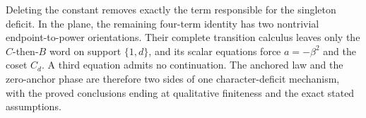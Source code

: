 \documentclass[11pt]{article}
\theoremstyle{definition}
\theoremstyle{remark}
\begin{document}
Deleting the constant removes exactly the term responsible for the singleton deficit.  In the plane, the remaining four-term identity has two nontrivial endpoint-to-power orientations.  Their complete transition calculus leaves only the $C$-then-$B$ word on support $\{1,d\}$, and its scalar equations force $a=-\beta^2$ and the coset $C_d$.  A third equation admits no continuation.  The anchored law and the zero-anchor phase are therefore two sides of one character-deficit mechanism, with the proved conclusions ending at qualitative finiteness and the exact stated assumptions.

\clearpage
\begingroup
\small


\endgroup
\end{document}
